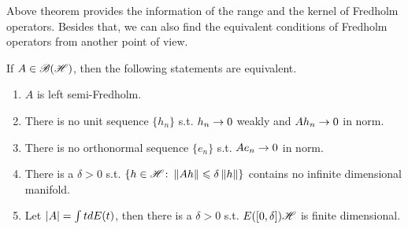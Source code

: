 Above theorem provides the information of the range and the kernel of Fredholm operators. Besides that, we can also find the equivalent conditions of Fredholm operators from another point of view.
\begin{thm}
	If $A \in \mathscr{B(H)}$, then the following statements are equivalent. 
	\begin{enumerate}[label=\arabic*)]
		\item $A$ is left semi-Fredholm.
		\item There is no unit sequence $\{h_n\}$ s.t. $h_n \rightarrow 0$ weakly and $Ah_n \rightarrow 0$ in norm.
		\item There is no orthonormal sequence $\{e_n\}$ s.t. $Ae_n \rightarrow 0$ in norm.
		\item There is a $\delta > 0$ s.t. $\{h \in \mathscr{H} \colon \left\lVert Ah\right\lVert \leqslant \delta \left\lVert h\right\lVert\}$ contains no infinite dimensional manifold.
		\item Let $\left\lvert A\right\lvert = \int t dE(t)$, then there is a $\delta > 0$ s.t. $E([0,\delta])\mathscr{H}$ is finite dimensional.
	\end{enumerate}
\end{thm}
